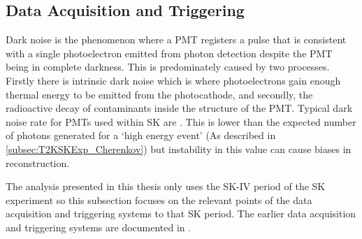 
\subsection{Data Acquisition and Triggering}
\label{subsec:T2KSKExp_SKTriggering}

Dark noise is the phenomenon where a PMT registers a pulse that is consistent with a single photoelectron emitted from photon detection despite the PMT being in complete darkness. This is predominately caused by two processes. Firstly there is intrinsic dark noise which is where photoelectrons gain enough thermal energy to be emitted from the photocathode, and secondly, the radioactive decay of contaminants inside the structure of the PMT. Typical dark noise rate for PMTs used within SK are  \cite{Fukuda2003-ly} . This is lower than the expected number of photons generated for a `high energy event' (As described in \autoref{subsec:T2KSKExp_Cherenkov}) but instability in this value can cause biases in reconstruction.

The analysis presented in this thesis only uses the SK-IV period of the SK experiment so this subsection focuses on the relevant points of the data acquisition and triggering systems to that SK period.
The earlier data acquisition and triggering systems are documented in \cite{34489,PhysRevD.73.112001}. 


